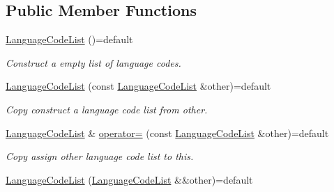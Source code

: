 \subsection*{Public Member Functions}
\begin{DoxyCompactItemize}
\item 
\hyperlink{class_mdt_1_1_translation_1_1_language_code_list_a43af112adc50a52b2c5b6d5648113803}{Language\+Code\+List} ()=default\hypertarget{class_mdt_1_1_translation_1_1_language_code_list_a43af112adc50a52b2c5b6d5648113803}{}\label{class_mdt_1_1_translation_1_1_language_code_list_a43af112adc50a52b2c5b6d5648113803}

\begin{DoxyCompactList}\small\item\em Construct a empty list of language codes. \end{DoxyCompactList}\item 
\hyperlink{class_mdt_1_1_translation_1_1_language_code_list_a929e09a08ff1e5103b3014ee9916fde0}{Language\+Code\+List} (const \hyperlink{class_mdt_1_1_translation_1_1_language_code_list}{Language\+Code\+List} \&other)=default\hypertarget{class_mdt_1_1_translation_1_1_language_code_list_a929e09a08ff1e5103b3014ee9916fde0}{}\label{class_mdt_1_1_translation_1_1_language_code_list_a929e09a08ff1e5103b3014ee9916fde0}

\begin{DoxyCompactList}\small\item\em Copy construct a language code list from {\itshape other}. \end{DoxyCompactList}\item 
\hyperlink{class_mdt_1_1_translation_1_1_language_code_list}{Language\+Code\+List} \& \hyperlink{class_mdt_1_1_translation_1_1_language_code_list_a362dc0cfc285f7a44648963f815304bf}{operator=} (const \hyperlink{class_mdt_1_1_translation_1_1_language_code_list}{Language\+Code\+List} \&other)=default\hypertarget{class_mdt_1_1_translation_1_1_language_code_list_a362dc0cfc285f7a44648963f815304bf}{}\label{class_mdt_1_1_translation_1_1_language_code_list_a362dc0cfc285f7a44648963f815304bf}

\begin{DoxyCompactList}\small\item\em Copy assign {\itshape other} language code list to this. \end{DoxyCompactList}\item 
\hyperlink{class_mdt_1_1_translation_1_1_language_code_list_a31373a8c159cb08cf3353c01722de4dc}{Language\+Code\+List} (\hyperlink{class_mdt_1_1_translation_1_1_language_code_list}{Language\+Code\+List} \&\&other)=default\hypertarget{class_mdt_1_1_translation_1_1_language_code_list_a31373a8c159cb08cf3353c01722de4dc}{}\label{class_mdt_1_1_translation_1_1_language_code_list_a31373a8c159cb08cf3353c01722de4dc}


\end{DoxyCompactItemize}

